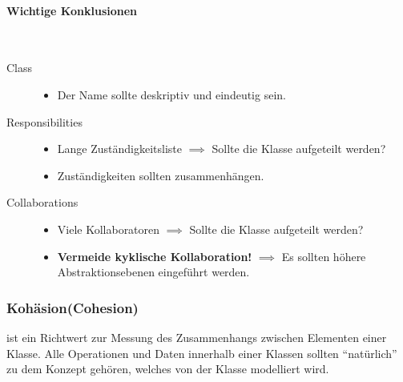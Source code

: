 \documentclass[ngerman,color=3b]{tuda_summary}
\begin{document}

\paragraph{Wichtige Konklusionen}\mbox{}\\
\begin{description}
    \item[Class]
          \begin{itemize}
              \item Der Name sollte deskriptiv und eindeutig sein.
          \end{itemize}
    \item[Responsibilities]
          \begin{itemize}
              \item Lange Zuständigkeitsliste  $ \implies $ Sollte die Klasse aufgeteilt werden?
              \item Zuständigkeiten sollten zusammenhängen.
          \end{itemize}
    \item[Collaborations]
          \begin{itemize}
              \item Viele Kollaboratoren $ \implies $ Sollte die Klasse aufgeteilt werden?
              \item \textbf{Vermeide kyklische Kollaboration!} $ \implies $ Es sollten höhere Abstraktionsebenen eingeführt werden.
          \end{itemize}
\end{description}

\subsubsection{Kohäsion(Cohesion)}
\begin{definition}[Kohäsion]
    ist ein Richtwert zur Messung des Zusammenhangs zwischen Elementen einer Klasse. Alle Operationen und Daten innerhalb einer Klassen sollten \enquote{natürlich} zu dem Konzept gehören, welches von der Klasse modelliert wird.
\end{definition}
\end{document}
